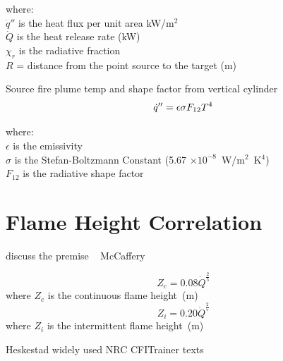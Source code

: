 \documentclass[twoside]{uocthesis}
\begin{document}
\begin{tabbing}
where: \=  \\

\> $\dot{q}''$ is the heat flux per unit area kW/m$^2$\\
\> $\dot{Q}$ is the heat release rate (kW) \\ 
\> $\chi_r$ is the radiative fraction \\
\> $R$ = distance from the point source to the target (m) \\
\end{tabbing}

Source fire plume temp and shape factor from vertical cylinder
\begin{equation}\label{eq:source_fire}
\dot{q}'' = \epsilon \sigma F_{12} T^4  \\
\end{equation}

\begin{tabbing}
where: \=  \\
\> $\epsilon$ is the emissivity  \\
\> $\sigma$ is the Stefan-Boltzmann Constant (5.67 $\times 10^{−8}$~W/m$^2$~K$^4$)  \\
\> $F_{12}$ is the radiative shape factor \\
\end{tabbing}

\section{Flame Height Correlation}

discuss the premise    ~\cite{McCaffrey:1979}
McCaffery

\begin{equation}\label{eq:z_c}
Z_c = 0.08 \dot{Q}^{\frac{2}{5}}
\end{equation}
where $Z_c$ is the continuous flame height~(m)
\begin{equation}\label{eq:z_i}
Z_i = 0.20 \dot{Q}^{\frac{2}{5}}
\end{equation}
where $Z_i$ is the intermittent flame height~(m)

Heskestad widely used  NRC CFITrainer  texts
\end{document}
